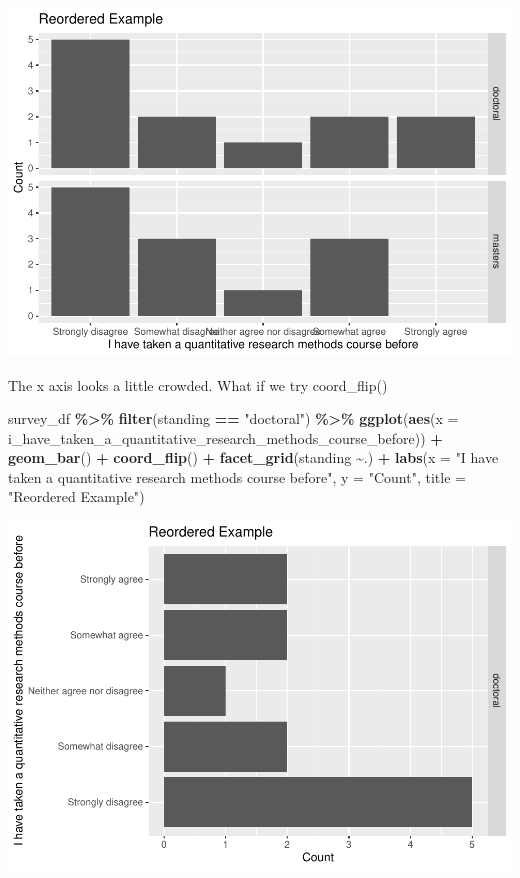 \documentclass[
]{book}
\newenvironment{Shaded}{\begin{snugshade}}{\end{snugshade}}
\newcommand{\DataTypeTok}[1]{\textcolor[rgb]{0.13,0.29,0.53}{#1}}
\newcommand{\KeywordTok}[1]{\textcolor[rgb]{0.13,0.29,0.53}{\textbf{#1}}}
\newcommand{\NormalTok}[1]{#1}
\newcommand{\OperatorTok}[1]{\textcolor[rgb]{0.81,0.36,0.00}{\textbf{#1}}}
\newcommand{\StringTok}[1]{\textcolor[rgb]{0.31,0.60,0.02}{#1}}
\begin{document}
\includegraphics{test_course_notes_files/figure-latex/unnamed-chunk-20-1.pdf}

The x axis looks a little crowded. What if we try coord\_flip()

\begin{Shaded}
\begin{Highlighting}[]
\NormalTok{survey\_df }\OperatorTok{\%\textgreater{}\%}\StringTok{ }
\StringTok{  }\KeywordTok{filter}\NormalTok{(standing }\OperatorTok{==}\StringTok{ "doctoral"}\NormalTok{) }\OperatorTok{\%\textgreater{}\%}
\StringTok{  }\KeywordTok{ggplot}\NormalTok{(}\KeywordTok{aes}\NormalTok{(}\DataTypeTok{x =}\NormalTok{ i\_have\_taken\_a\_quantitative\_research\_methods\_course\_before)) }\OperatorTok{+}
\StringTok{  }\KeywordTok{geom\_bar}\NormalTok{() }\OperatorTok{+}
\StringTok{  }\KeywordTok{coord\_flip}\NormalTok{() }\OperatorTok{+}
\StringTok{  }\KeywordTok{facet\_grid}\NormalTok{(standing }\OperatorTok{\textasciitilde{}}\NormalTok{.) }\OperatorTok{+}
\StringTok{  }\KeywordTok{labs}\NormalTok{(}\DataTypeTok{x =} \StringTok{"I have taken a quantitative research methods course before"}\NormalTok{,}
       \DataTypeTok{y =} \StringTok{"Count"}\NormalTok{,}
       \DataTypeTok{title =} \StringTok{"Reordered Example"}\NormalTok{)}
\end{Highlighting}
\end{Shaded}

\includegraphics{test_course_notes_files/figure-latex/unnamed-chunk-21-1.pdf}
\end{document}
